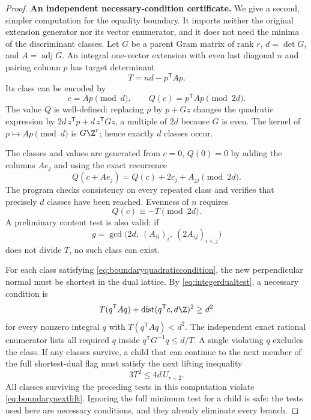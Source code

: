 \begin{proof}
\textbf{An independent necessary-condition certificate.}
We give a second, simpler computation for the equality boundary. It imports neither the original extension generator nor its vector enumerator, and it does not need the minima of the discriminant classes. Let $G$ be a parent Gram matrix of rank $r$, $d=\det G$, and $A=\operatorname{adj}G$. An integral one-vector extension with even last diagonal $n$ and pairing column $p$ has target determinant
\[
T=nd-p^{\mathsf T}Ap.
\]
Its class can be encoded by
\[
c=Ap\pmod d,\qquad Q(c)=p^{\mathsf T}Ap\pmod{2d}.
\]
The value $Q$ is well-defined: replacing $p$ by $p+Gz$ changes the quadratic expression by $2d\,z^{\mathsf T}p+d\,z^{\mathsf T}Gz$, a multiple of $2d$ because $G$ is even. The kernel of $p\mapsto Ap\pmod d$ is $G\Z^r$; hence exactly $d$ classes occur.

The classes and values are generated from $c=0$, $Q(0)=0$ by adding the columns $Ae_j$ and using the exact recurrence
\begin{equation}\label{eq:finitequadraticrecurrence}
Q(c+Ae_j)=Q(c)+2c_j+A_{jj}\pmod{2d}.
\end{equation}
The program checks consistency on every repeated class and verifies that precisely $d$ classes have been reached. Evenness of $n$ requires
\begin{equation}\label{eq:boundaryquadraticcondition}
Q(c)\equiv-T\pmod{2d}.
\end{equation}
A preliminary content test is also valid: if
\[
g=\gcd\bigl(2d,\ (A_{ii})_i,\ (2A_{ij})_{i<j}\bigr)
\]
does not divide $T$, no such class can exist.

For each class satisfying \eqref{eq:boundaryquadraticcondition}, the new perpendicular normal must be shortest in the dual lattice. By \eqref{eq:integerdualtest}, a necessary condition is
\begin{equation}\label{eq:boundarydualcondition}
T(q^{\mathsf T}Aq)+\operatorname{dist}(q^{\mathsf T}c,d\Z)^2\ge d^2
\end{equation}
for every nonzero integral $q$ with $T(q^{\mathsf T}Aq)<d^2$. The independent exact rational enumerator lists all required $q$ inside $q^{\mathsf T}G^{-1}q\le d/T$. A single violating $q$ excludes the class. If any classes survive, a child that can continue to the next member of the full shortest-dual flag must satisfy the next lifting inequality
\begin{equation}\label{eq:boundarynextlift}
3T^2\le4d\,U_{r+2}.
\end{equation}
All classes surviving the preceding tests in this computation violate \eqref{eq:boundarynextlift}. Ignoring the full minimum test for a child is safe: the tests used here are necessary conditions, and they already eliminate every branch.


\end{proof}
